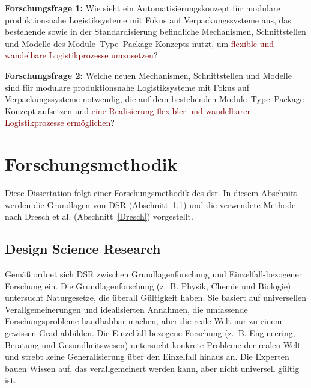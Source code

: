 \begin{graybox}
	\textbf{Forschungsfrage 1:} Wie sieht \textcolor{BurntOrange}{ein Automatisierungskonzept} für \textcolor{NavyBlue}{modulare produktionsnahe Logistiksysteme mit Fokus auf Verpackungssysteme} aus, das \textcolor{OliveGreen}{bestehende sowie in der Standardisierung befindliche Mechanismen, Schnittstellen und Modelle des Module~Type~Package-Konzepts nutzt}, um \textcolor{Maroon}{flexible und wandelbare Logistikprozesse umzusetzen}? 
\end{graybox}

\begin{graybox}
	\textbf{Forschungsfrage 2:} Welche \textcolor{BurntOrange}{neuen Mechanismen, Schnittstellen und Modelle} sind für \textcolor{NavyBlue}{modulare produktionsnahe Logistiksysteme mit Fokus auf Verpackungssysteme} notwendig, die \textcolor{OliveGreen}{auf dem bestehenden Module~Type~Package-Konzept aufsetzen} und \textcolor{Maroon}{eine Realisierung flexibler und wandelbarer Logistikprozesse ermöglichen}?  
\end{graybox}

\section{Forschungsmethodik}
\label{sec:methodik}

Diese Dissertation folgt einer Forschungsmethodik des \gls{dsr}. In diesem Abschnitt werden die Grundlagen von DSR (Abschnitt~\ref{sec:DSR}) und die verwendete Methode nach Dresch et al. (Abschnitt~\ref{Dresch}) vorgestellt.

\subsection{Design Science Research}
\label{sec:DSR}

Gemäß \cite{Wieringa.2014} ordnet sich DSR zwischen Grundlagenforschung und Ein\-zel\-fall-bezogener Forschung ein. Die Grundlagenforschung (z.~B. Physik, Chemie und Biologie) untersucht Naturgesetze, die überall Gültigkeit haben. Sie basiert auf universellen Verallgemeinerungen und idealisierten Annahmen, die umfassende Forschungsprobleme handhabbar machen, aber die reale Welt nur zu einem gewissen Grad abbilden. Die Einzelfall-bezogene Forschung (z.~B. Engineering, Beratung und Gesundheitswesen) untersucht konkrete Probleme der realen Welt und strebt keine Generalisierung über den Einzelfall hinaus an. Die Experten bauen Wissen auf, das verallgemeinert werden kann, aber nicht universell gültig ist. \cite{Wieringa.2014}

